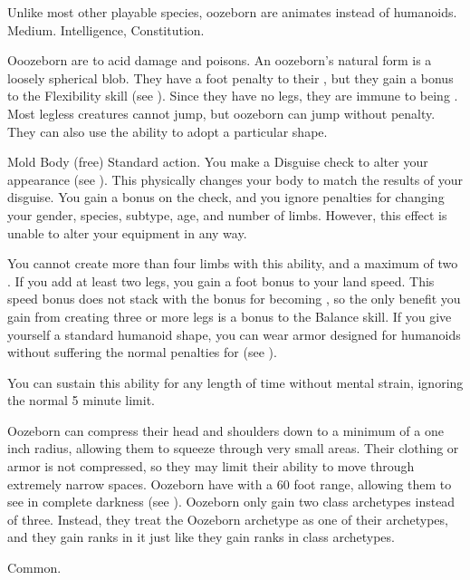  Unlike most other playable species, oozeborn are animates instead of humanoids.
 Medium.
  Intelligence,  Constitution.
\begin{itemize}
	 Ooozeborn are  to acid damage and poisons.
	 An oozeborn's natural form is a loosely spherical blob.
	      They have a  foot penalty to their , but they gain a  bonus to the Flexibility skill (see ).
	      Since they have no legs, they are immune to being \prone.
	      Most legless creatures cannot jump, but oozeborn can jump without penalty.
	      They can also use the  ability to adopt a particular shape.
	      \begin{sustainability}{Mold Body}{ (free)}
		      \abilityusagetime Standard action.
		      \rankline
		      You make a Disguise check to alter your appearance (see ).
		      This physically changes your body to match the results of your disguise.
		      You gain a  bonus on the check, and you ignore penalties for changing your gender, species, subtype, age, and number of limbs.
		      However, this effect is unable to alter your equipment in any way.

		      You cannot create more than four limbs with this ability, and a maximum of two .
		      If you add at least two legs, you gain a  foot bonus to your land speed.
		      This speed bonus does not stack with the bonus for becoming , so the only benefit you gain from creating three or more legs is a  bonus to the Balance skill.
		      If you give yourself a standard humanoid shape, you can wear armor designed for humanoids without suffering the normal penalties for  (see ).

		      You can sustain this ability for any length of time without mental strain, ignoring the normal 5 minute limit.
	      \end{sustainability}
	 Oozeborn can compress their head and shoulders down to a minimum of a one inch radius, allowing them to squeeze through very small areas.
	      Their clothing or armor is not compressed, so they may limit their ability to move through extremely narrow spaces.
	 Oozeborn have  with a 60 foot range, allowing them to see in complete darkness (see ).
	 Oozeborn only gain two class archetypes instead of three.
	      Instead, they treat the Oozeborn archetype as one of their archetypes, and they gain ranks in it just like they gain ranks in class archetypes.
\end{itemize}
 Common.

